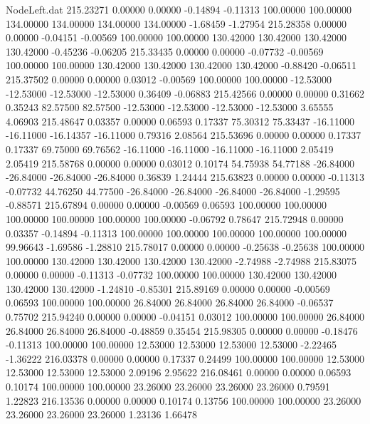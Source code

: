 \begin{filecontents}{NodeLeft.dat}
 215.23271    0.00000    0.00000    -0.14894   -0.11313  100.00000  100.00000  134.00000  134.00000  134.00000  134.00000   -1.68459   -1.27954
 215.28358    0.00000    0.00000    -0.04151   -0.00569  100.00000  100.00000  130.42000  130.42000  130.42000  130.42000   -0.45236   -0.06205
 215.33435    0.00000    0.00000    -0.07732   -0.00569  100.00000  100.00000  130.42000  130.42000  130.42000  130.42000   -0.88420   -0.06511
 215.37502    0.00000    0.00000     0.03012   -0.00569  100.00000  100.00000  -12.53000  -12.53000  -12.53000  -12.53000    0.36409   -0.06883
 215.42566    0.00000    0.00000     0.31662    0.35243   82.57500   82.57500  -12.53000  -12.53000  -12.53000  -12.53000    3.65555    4.06903
 215.48647    0.03357    0.00000     0.06593    0.17337   75.30312   75.33437  -16.11000  -16.11000  -16.14357  -16.11000    0.79316    2.08564
 215.53696    0.00000    0.00000     0.17337    0.17337   69.75000   69.76562  -16.11000  -16.11000  -16.11000  -16.11000    2.05419    2.05419
 215.58768    0.00000    0.00000     0.03012    0.10174   54.75938   54.77188  -26.84000  -26.84000  -26.84000  -26.84000    0.36839    1.24444
 215.63823    0.00000    0.00000    -0.11313   -0.07732   44.76250   44.77500  -26.84000  -26.84000  -26.84000  -26.84000   -1.29595   -0.88571
 215.67894    0.00000    0.00000    -0.00569    0.06593  100.00000  100.00000  100.00000  100.00000  100.00000  100.00000   -0.06792    0.78647
 215.72948    0.00000    0.03357    -0.14894   -0.11313  100.00000  100.00000  100.00000  100.00000  100.00000   99.96643   -1.69586   -1.28810
 215.78017    0.00000    0.00000    -0.25638   -0.25638  100.00000  100.00000  130.42000  130.42000  130.42000  130.42000   -2.74988   -2.74988
 215.83075    0.00000    0.00000    -0.11313   -0.07732  100.00000  100.00000  130.42000  130.42000  130.42000  130.42000   -1.24810   -0.85301
 215.89169    0.00000    0.00000    -0.00569    0.06593  100.00000  100.00000   26.84000   26.84000   26.84000   26.84000   -0.06537    0.75702
 215.94240    0.00000    0.00000    -0.04151    0.03012  100.00000  100.00000   26.84000   26.84000   26.84000   26.84000   -0.48859    0.35454
 215.98305    0.00000    0.00000    -0.18476   -0.11313  100.00000  100.00000   12.53000   12.53000   12.53000   12.53000   -2.22465   -1.36222
 216.03378    0.00000    0.00000     0.17337    0.24499  100.00000  100.00000   12.53000   12.53000   12.53000   12.53000    2.09196    2.95622
 216.08461    0.00000    0.00000     0.06593    0.10174  100.00000  100.00000   23.26000   23.26000   23.26000   23.26000    0.79591    1.22823
 216.13536    0.00000    0.00000     0.10174    0.13756  100.00000  100.00000   23.26000   23.26000   23.26000   23.26000    1.23136    1.66478

\end{filecontents}
